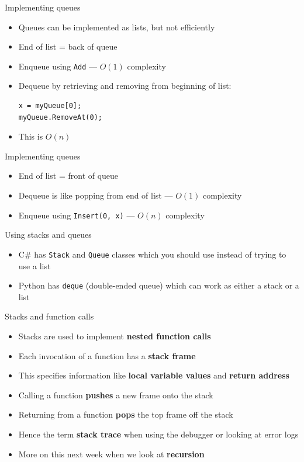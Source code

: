 \begin{frame}[fragile]{Implementing queues}
	\begin{itemize}
		\pause\item Queues can be implemented as lists, but not efficiently
		\pause\item End of list = back of queue
		\pause\item Enqueue using \lstinline{Add} --- $O(1)$ complexity
		\pause\item Dequeue by retrieving and removing from beginning of list:
			\begin{lstlisting}
x = myQueue[0];
myQueue.RemoveAt(0);
			\end{lstlisting}
		\pause\item This is $O(n)$
	\end{itemize}
\end{frame}

\begin{frame}[fragile]{Implementing queues}
	\begin{itemize}
		\pause\item End of list = front of queue
		\pause\item Dequeue is like popping from end of list --- $O(1)$ complexity
		\pause\item Enqueue using \lstinline{Insert(0, x)} --- $O(n)$ complexity
	\end{itemize}
\end{frame}

\begin{frame}{Using stacks and queues}
	\begin{itemize}
		\pause\item C\# has \lstinline{Stack} and \lstinline{Queue} classes which you should use instead of trying to use a list
		\pause\item Python has \lstinline{deque} (double-ended queue) which can work as either a stack or a list
	\end{itemize}
\end{frame}

\begin{frame}{Stacks and function calls}
	\begin{itemize}
		\pause\item Stacks are used to implement \textbf{nested function calls}
		\pause\item Each invocation of a function has a \textbf{stack frame}
		\pause\item This specifies information like \textbf{local variable values} and \textbf{return address}
		\pause\item Calling a function \textbf{pushes} a new frame onto the stack
		\pause\item Returning from a function \textbf{pops} the top frame off the stack
		\pause\item Hence the term \textbf{stack trace} when using the debugger or looking at error logs
		\pause\item More on this next week when we look at \textbf{recursion}
	\end{itemize}
\end{frame}
